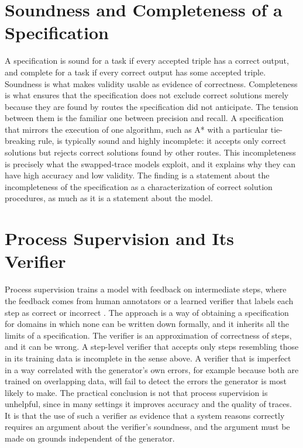 \section{Soundness and Completeness of a Specification}

A specification is sound for a task if every accepted triple has a correct output, and complete for a task if every correct output has some accepted triple. Soundness is what makes validity usable as evidence of correctness. Completeness is what ensures that the specification does not exclude correct solutions merely because they are found by routes the specification did not anticipate. The tension between them is the familiar one between precision and recall. A specification that mirrors the execution of one algorithm, such as A* with a particular tie-breaking rule, is typically sound and highly incomplete: it accepts only correct solutions but rejects correct solutions found by other routes. This incompleteness is precisely what the swapped-trace models exploit, and it explains why they can have high accuracy and low validity. The finding is a statement about the incompleteness of the specification as a characterization of correct solution procedures, as much as it is a statement about the model.

\section{Process Supervision and Its Verifier}

Process supervision trains a model with feedback on intermediate steps, where the feedback comes from human annotators or a learned verifier that labels each step as correct or incorrect \cite{lightman2023}. The approach is a way of obtaining a specification for domains in which none can be written down formally, and it inherits all the limits of a specification. The verifier is an approximation of correctness of steps, and it can be wrong. A step-level verifier that accepts only steps resembling those in its training data is incomplete in the sense above. A verifier that is imperfect in a way correlated with the generator's own errors, for example because both are trained on overlapping data, will fail to detect the errors the generator is most likely to make. The practical conclusion is not that process supervision is unhelpful, since in many settings it improves accuracy and the quality of traces. It is that the use of such a verifier as evidence that a system reasons correctly requires an argument about the verifier's soundness, and the argument must be made on grounds independent of the generator.


